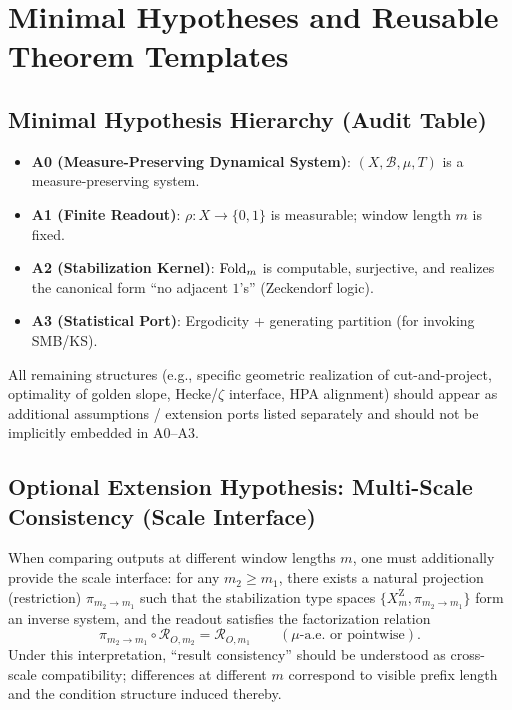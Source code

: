 \section{Minimal Hypotheses and Reusable Theorem Templates}

\subsection{Minimal Hypothesis Hierarchy (Audit Table)}

\begin{itemize}
  \item \textbf{A0 (Measure-Preserving Dynamical System)}: $(X,\mathcal{B},\mu,T)$ is a measure-preserving system.
  \item \textbf{A1 (Finite Readout)}: $\rho:X\to\{0,1\}$ is measurable; window length $m$ is fixed.
  \item \textbf{A2 (Stabilization Kernel)}: $\mathrm{Fold}_m$ is computable, surjective, and realizes the canonical form ``no adjacent $1$'s'' (Zeckendorf logic).
  \item \textbf{A3 (Statistical Port)}: Ergodicity + generating partition (for invoking SMB/KS).
\end{itemize}

All remaining structures (e.g., specific geometric realization of cut-and-project, optimality of golden slope, Hecke/\(\zeta\) interface, HPA alignment) should appear as additional assumptions / extension ports listed separately and should not be implicitly embedded in A0--A3.

\subsection{Optional Extension Hypothesis: Multi-Scale Consistency (Scale Interface)}

\begin{assumption}\label{assump:A4-scale}
When comparing outputs at different window lengths $m$, one must additionally provide the scale interface: for any $m_2\ge m_1$, there exists a natural projection (restriction) $\pi_{m_2\to m_1}$ such that the stabilization type spaces $\{X_m^{\mathrm Z},\pi_{m_2\to m_1}\}$ form an inverse system, and the readout satisfies the factorization relation
\[
\pi_{m_2\to m_1}\circ \mathcal{R}_{O,m_2}=\mathcal{R}_{O,m_1}\qquad (\mu\text{-a.e. or pointwise}).
\]
Under this interpretation, ``result consistency'' should be understood as cross-scale compatibility; differences at different $m$ correspond to visible prefix length and the condition structure induced thereby.
\end{assumption}

